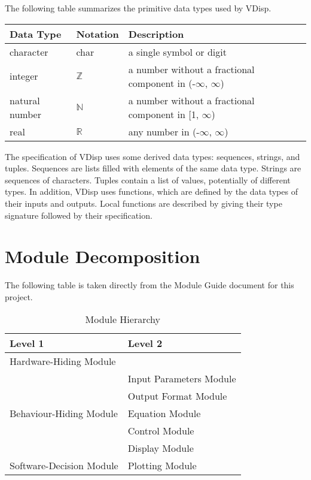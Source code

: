 \documentclass[12pt, titlepage]{article}
\begin{document}
The following table summarizes the primitive data types used by VDisp. 

\begin{center}
\renewcommand{\arraystretch}{1.2}
\noindent 
\begin{tabular}{l l p{7.5cm}} 
\toprule 
\textbf{Data Type} & \textbf{Notation} & \textbf{Description}\\ 
\midrule
character & char & a single symbol or digit\\
integer & $\mathbb{Z}$ & a number without a fractional component in (-$\infty$, $\infty$) \\
natural number & $\mathbb{N}$ & a number without a fractional component in [1, $\infty$) \\
real & $\mathbb{R}$ & any number in (-$\infty$, $\infty$)\\
\bottomrule
\end{tabular} 
\end{center}

\noindent
The specification of VDisp uses some derived data types: sequences, strings, and
tuples. Sequences are lists filled with elements of the same data type. Strings
are sequences of characters. Tuples contain a list of values, potentially of
different types. In addition, VDisp uses functions, which
are defined by the data types of their inputs and outputs. Local functions are
described by giving their type signature followed by their specification.

\section{Module Decomposition}

The following table is taken directly from the Module Guide document for this project.

\begin{table}[h!]
\centering
\begin{tabular}{p{} p{}}
\toprule
\textbf{Level 1} & \textbf{Level 2}\\
\midrule

{Hardware-Hiding Module} & ~ \\
\midrule

\multirow{5}{0.3\textwidth}{Behaviour-Hiding Module} & Input Parameters Module\\
& Output Format Module\\
& Equation Module\\
& Control Module\\
& Display Module \\
\midrule

{Software-Decision Module} & Plotting Module\\
\bottomrule

\end{tabular}
\caption{Module Hierarchy}
\label{TblMH}
\end{table}
  
\end{document}
